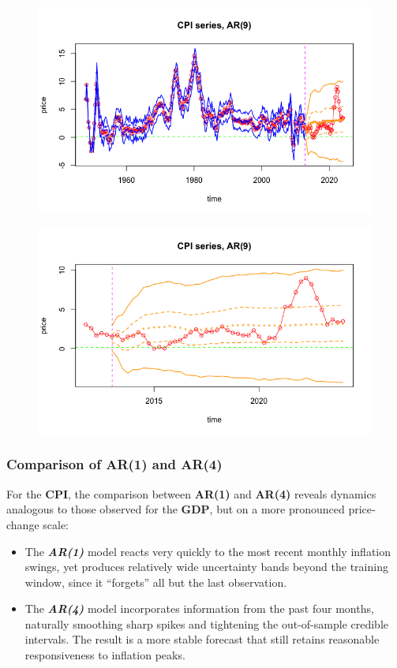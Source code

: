 \documentclass{Configuration_Files/PoliMi3i_thesis}
\begin{document}
\begin{figure}[H]
	    \centering
	    \includegraphics[width=0.7\linewidth]{CPI_FAR(9).png}
        \label{fig:CPI_FAR(9)}
	\end{figure}
\begin{figure}[H]
    \centering
    \includegraphics[width=0.7\linewidth]{CPI_ZAR(9)-1.png}
    \label{fig:CPI_ZAR(9)}
\end{figure}

\subsubsection*{Comparison of AR(1) and AR(4)}
For the \textbf{CPI}, the comparison between \textbf{AR(1)} and \textbf{AR(4)} reveals dynamics analogous to those observed for the \textbf{GDP}, but on a more pronounced price‐change scale:
\begin{itemize}
    \item The \textbf{\textit{AR(1)}} model reacts very quickly to the most recent monthly inflation swings, yet produces relatively wide uncertainty bands beyond the training window, since it “forgets” all but the last observation.
	\item The \textbf{\textit{AR(4)}} model incorporates information from the past four months, naturally smoothing sharp spikes and tightening the out-of-sample credible intervals. The result is a more stable forecast that still retains reasonable responsiveness to inflation peaks.
\end{itemize}
\end{document}
